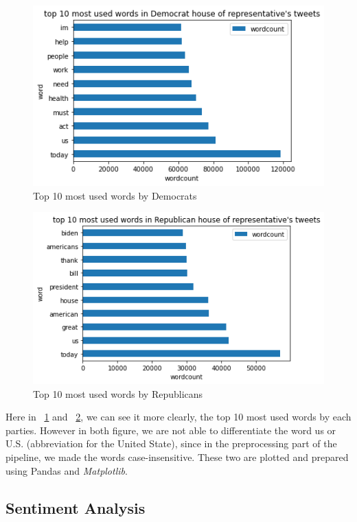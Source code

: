 \begin{figure}
  \centering
  \includegraphics[width=0.8\linewidth]{images/Kapitel3/Democrat_Top_10.png}
	\caption{\label{fig:boat1}Top 10 most used words by Democrats}{}
\end{figure}

\begin{figure}
  \centering
  \includegraphics[width=0.8\linewidth]{images/Kapitel3/Republican_Top_10.png}
	\caption{\label{fig:boat2}Top 10 most used words by Republicans}{}
\end{figure}

Here in ~\ref{fig:boat1} and ~\ref{fig:boat2}, we can see it more clearly, the top 10 most used words by each parties. However in both figure, we are not able to differentiate the word us or U.S. (abbreviation for the United State), since in the preprocessing part of the pipeline, we made the words case-insensitive. These two are plotted and prepared using Pandas and \textit{Matplotlib}. 


\subsection{Sentiment Analysis}

